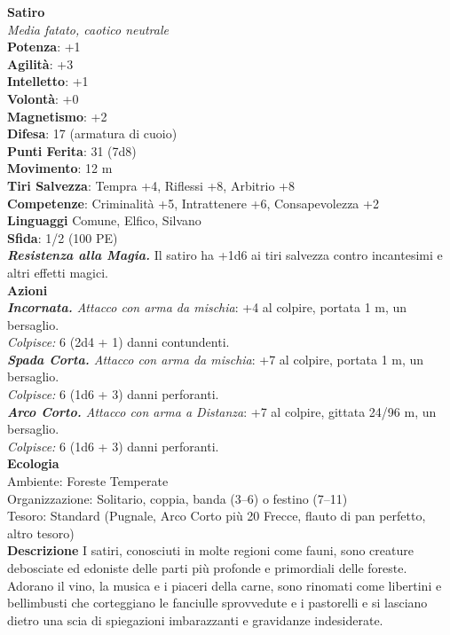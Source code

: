 \begin{multicols}{2}
\medskip\textbf{Satiro}\\
\emph{Media fatato, caotico neutrale}\\
\textbf{Potenza}: +1\\
\textbf{Agilità}: +3\\
\textbf{Intelletto}: +1\\
\textbf{Volontà}: +0\\
\textbf{Magnetismo}: +2\\
\textbf{Difesa}: 17 (armatura di cuoio)\\
\textbf{Punti Ferita}: 31 (7d8)\\
\textbf{Movimento}: 12 m\\
\textbf{Tiri Salvezza}: Tempra +4, Riflessi +8, Arbitrio +8\\
\textbf{Competenze}: Criminalità +5, Intrattenere +6, Consapevolezza +2\\
\textbf{Linguaggi} Comune, Elfico, Silvano\\
\textbf{Sfida}: 1/2 (100 PE)\smallskip\\
\emph{\textbf{Resistenza alla Magia.}} Il satiro ha +1d6 ai tiri salvezza contro incantesimi e altri effetti magici.\\
\smallskip\textbf{Azioni}\\
\emph{\textbf{Incornata.} Attacco con arma da mischia}: +4 al colpire, portata 1 m, un bersaglio.\\
\emph{Colpisce:} 6 (2d4 + 1) danni contundenti.\\
\emph{\textbf{Spada Corta.} Attacco con arma da mischia}: +7 al colpire, portata 1 m, un bersaglio.\\
\emph{Colpisce:} 6 (1d6 + 3) danni perforanti.\\
\emph{\textbf{Arco Corto.} Attacco con arma a Distanza}: +7 al colpire, gittata 24/96 m, un bersaglio.\\
\emph{Colpisce:} 6 (1d6 + 3) danni perforanti.\\
\textbf{Ecologia}\\
Ambiente: Foreste Temperate\\
Organizzazione: Solitario, coppia, banda (3–6) o festino (7–11)\\
Tesoro: Standard (Pugnale, Arco Corto più 20 Frecce, flauto di pan perfetto, altro tesoro)\\
\textbf{Descrizione}
I satiri, conosciuti in molte regioni come fauni, sono creature debosciate ed edoniste delle parti più profonde e primordiali delle foreste. Adorano il vino, la musica e i piaceri della carne, sono rinomati come libertini e bellimbusti che corteggiano le fanciulle sprovvedute e i pastorelli e si lasciano dietro una scia di spiegazioni imbarazzanti e gravidanze indesiderate.\\


\end{multicols}
